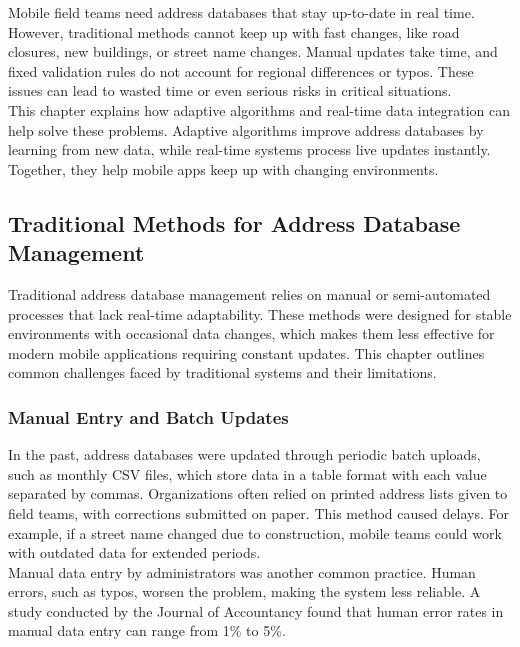 \Author{\daAuthorOne}

Mobile field teams need address databases that stay up-to-date in real time. However, traditional methods cannot keep up with fast changes, like road closures, new buildings, or street name changes. Manual updates take time, and fixed validation rules do not account for regional differences or typos. These issues can lead to wasted time or even serious risks in critical situations.\\

This chapter explains how adaptive algorithms and real-time data integration can help solve these problems. Adaptive algorithms improve address databases by learning from new data, while real-time systems process live updates instantly. Together, they help mobile apps keep up with changing environments.


    \subsection{Traditional Methods for Address Database Management}

    Traditional address database management relies on manual or semi-automated processes that lack real-time adaptability. These methods were designed for stable environments with occasional data changes, which makes them less effective for modern mobile applications requiring constant updates. This chapter outlines common challenges faced by traditional systems and their limitations.


        \subsubsection{Manual Entry and Batch Updates}
        In the past, address databases were updated through periodic batch uploads, such as monthly CSV files, which store data in a table format with each value separated by commas. Organizations often relied on printed address lists given to field teams, with corrections submitted on paper. This method caused delays. For example, if a street name changed due to construction, mobile teams could work with outdated data for extended periods. \autocite{FasterCapital2025Mar}\\


        Manual data entry by administrators was another common practice. Human errors, such as typos, worsen the problem, making the system less reliable. A study conducted by the Journal of Accountancy found that human error rates in manual data entry can range from 1\% to 5\%. \autocite{integrationmadeeasy2025Mar}


